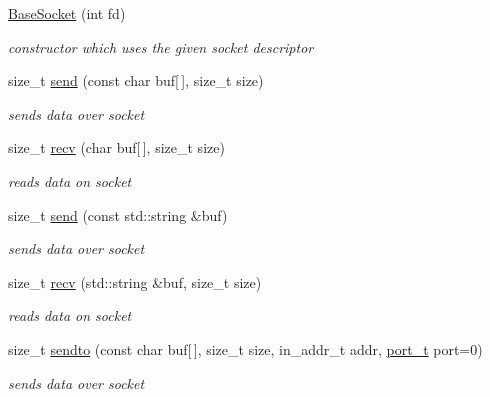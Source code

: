 \begin{CompactItemize}
\begin{CompactItemize}
\hyperlink{classsocketpp_1_1BaseSocket_f7e18d6700868abb2b476e797506eafb}{BaseSocket} (int fd)
\begin{CompactList}\small\item\em constructor which uses the given socket descriptor \item\end{CompactList}\item 
size\_\-t \hyperlink{classsocketpp_1_1BaseSocket_bf4e15b88271e34e606b9b2a5b384b5b}{send} (const char buf\mbox{[}$\,$\mbox{]}, size\_\-t size)
\begin{CompactList}\small\item\em sends data over socket \item\end{CompactList}\item 
size\_\-t \hyperlink{classsocketpp_1_1BaseSocket_08b3e29d019575293fa134c6d91d6cbb}{recv} (char buf\mbox{[}$\,$\mbox{]}, size\_\-t size)
\begin{CompactList}\small\item\em reads data on socket \item\end{CompactList}\item 
size\_\-t \hyperlink{classsocketpp_1_1BaseSocket_fb896f016a243ddbb661acc7b05826bf}{send} (const std::string \&buf)
\begin{CompactList}\small\item\em sends data over socket \item\end{CompactList}\item 
size\_\-t \hyperlink{classsocketpp_1_1BaseSocket_25fc62d259f6d12f1b1a5001a7512897}{recv} (std::string \&buf, size\_\-t size)
\begin{CompactList}\small\item\em reads data on socket \item\end{CompactList}\item 
size\_\-t \hyperlink{classsocketpp_1_1BaseSocket_33ef257bb6eb0f23ae0680df57738f3a}{sendto} (const char buf\mbox{[}$\,$\mbox{]}, size\_\-t size, in\_\-addr\_\-t addr, \hyperlink{namespacesocketpp_5517ef80f249b891a2ba64b95fc1e723}{port\_\-t} port=0)
\begin{CompactList}\small\item\em sends data over socket \item\end{CompactList}\item 

\end{CompactItemize}
\end{CompactItemize}
